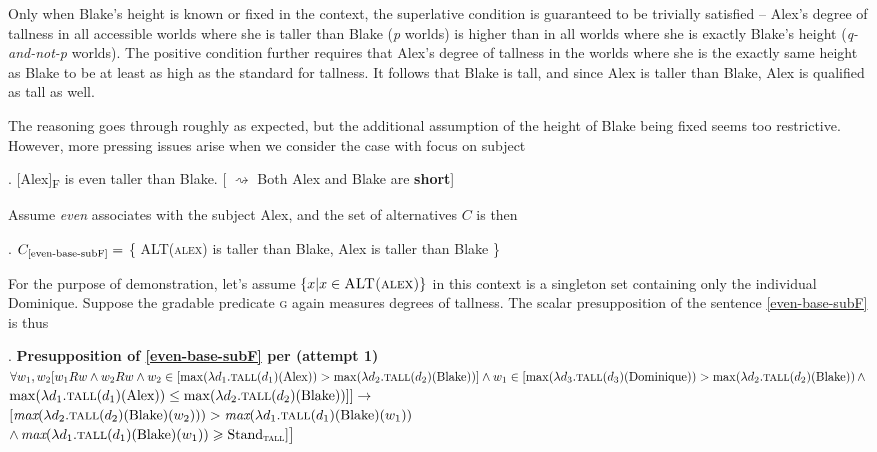 \documentclass[12pt,letterpaper]{scrartcl}
\makeatletter
\newif\if@repeated\@repeatedfalse
\newcounter{savedExNo}
\newcommand{\exr}[1]{%
\@repeatedtrue
\setcounter{savedExNo}{\value{ExNo}}
\def\tmp@ref{#1}
\ex.}
\newcommand{\alignright}{\hspace*{\fill}}
\newcommand{\infer}{$\rightsquigarrow$ }
\makeatother
\begin{document}
Only when Blake's height is known or fixed in the context, the superlative condition is guaranteed to be trivially satisfied  -- Alex's degree of tallness in all accessible worlds where she is taller than Blake (\textit{p} worlds) is higher than in all worlds where she is exactly Blake's height (\textit{q-and-not-p} worlds). The positive condition further requires that Alex's degree of tallness in the worlds where she is the exactly same height as Blake to be at least as high as the standard for tallness. It follows that Blake is tall, and since Alex is taller than Blake, Alex is qualified as tall as well.

The reasoning goes through roughly as expected, but the additional assumption of the height of Blake being fixed seems too restrictive. However, more pressing issues arise when we consider the case with focus on subject

\exr{even-base-subF} [Alex]\textsubscript{F} is even taller than Blake. 
\alignright [ \infer Both Alex and Blake are \textbf{short}]

Assume \textit{even} associates with the subject Alex, and the set of alternatives $C$ is then

\ex. $C_{\text{\ref{even-base-subF}}} =$ \{ \textsc{ALT(alex)} is taller than Blake, Alex is taller than Blake \}
 
For the purpose of demonstration, let's assume $\{x | x \in \textsc{ALT(alex)}\}$ in this context is a singleton set containing only the individual Dominique. Suppose the gradable predicate \textsc{g} again measures degrees of tallness. The scalar presupposition of the sentence \ref{even-base-subF} is thus

\ex. \textbf{Presupposition of \ref{even-base-subF} per \cite{greenberg_revised_2018} (attempt 1)} \\ 
    $\forall w_1, w_2 [w_1Rw \land w_2Rw \land w_2 \in [\max(\lambda d_1.\textsc{tall}(d_1)(\text{Alex})) > \max(\lambda d_2.\textsc{tall}(d_2)(\text{Blake}))]  
    \land 
    w_1 \in [\max(\lambda d_3.\textsc{tall}(d_3)(\text{Dominique})) >  \max(\lambda d_2.\textsc{tall}(d_2)(\text{Blake})) \, \land$ \\  \hspace*{\fill} $\max(\lambda d_1.\textsc{tall}(d_1)(\text{Alex})) \leq \max(\lambda d_2.\textsc{tall}(d_2)(\text{Blake}))]] \rightarrow
    $ \\
    $[\textit{max}(\lambda d_2.\textsc{tall}(d_2)(\text{Blake})(w_2))) > \textit{max}(\lambda d_1.\textsc{tall}(d_1)(\text{Blake})(w_1))$ \\ 
    $\land \, \textit{max}(\lambda d_1.\textsc{tall}(d_1)(\text{Blake})(w_1)) \geqslant \text{Stand}_{\textsc{tall}} ] \big]$
    
\end{document}

